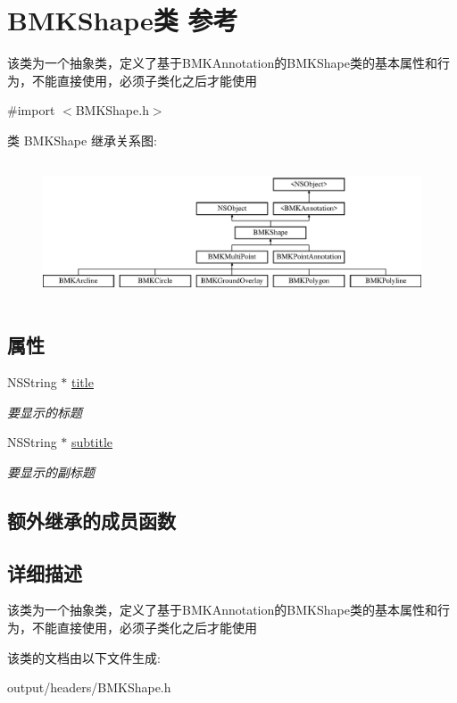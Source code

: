 \hypertarget{interface_b_m_k_shape}{}\section{B\+M\+K\+Shape类 参考}
\label{interface_b_m_k_shape}


该类为一个抽象类，定义了基于\+B\+M\+K\+Annotation的\+B\+M\+K\+Shape类的基本属性和行为，不能直接使用，必须子类化之后才能使用  




{\ttfamily \#import $<$B\+M\+K\+Shape.\+h$>$}

类 B\+M\+K\+Shape 继承关系图\+:\begin{figure}[H]
\begin{center}
\leavevmode
\includegraphics[height=4.148148cm]{interface_b_m_k_shape}
\end{center}
\end{figure}
\subsection*{属性}
\begin{DoxyCompactItemize}
\item 
\hypertarget{interface_b_m_k_shape_a64da6d2885114c0c2da35aa1ffec925d}{}N\+S\+String $\ast$ \hyperlink{interface_b_m_k_shape_a64da6d2885114c0c2da35aa1ffec925d}{title}\label{interface_b_m_k_shape_a64da6d2885114c0c2da35aa1ffec925d}

\begin{DoxyCompactList}\small\item\em 要显示的标题 \end{DoxyCompactList}\item 
\hypertarget{interface_b_m_k_shape_ae588ba39a27b52bcaed14d40e6494398}{}N\+S\+String $\ast$ \hyperlink{interface_b_m_k_shape_ae588ba39a27b52bcaed14d40e6494398}{subtitle}\label{interface_b_m_k_shape_ae588ba39a27b52bcaed14d40e6494398}

\begin{DoxyCompactList}\small\item\em 要显示的副标题 \end{DoxyCompactList}\end{DoxyCompactItemize}
\subsection*{额外继承的成员函数}


\subsection{详细描述}
该类为一个抽象类，定义了基于\+B\+M\+K\+Annotation的\+B\+M\+K\+Shape类的基本属性和行为，不能直接使用，必须子类化之后才能使用 

该类的文档由以下文件生成\+:\begin{DoxyCompactItemize}
\item 
output/headers/B\+M\+K\+Shape.\+h\end{DoxyCompactItemize}
